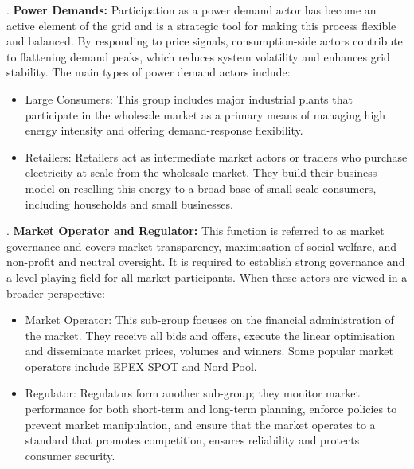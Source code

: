 . \textbf{Power Demands:} Participation as a power demand actor has become an active element of the grid and is a strategic tool for making this process flexible and balanced. By responding to price signals, consumption-side actors contribute to flattening demand peaks, which reduces system volatility and enhances grid stability. The main types of power demand actors include:
\begin{itemize}
    \item Large Consumers: This group includes major industrial plants that participate in the wholesale market as a primary means of managing high energy intensity and offering demand-response flexibility.
    \item Retailers: Retailers act as intermediate market actors or traders who purchase electricity at scale from the wholesale market. They build their business model on reselling this energy to a broad base of small-scale consumers, including households and small businesses.
\end{itemize}

. \textbf{Market Operator and Regulator:} This function is referred to as market governance and covers market transparency, maximisation of social welfare, and non-profit and neutral oversight. It is required to establish strong governance and a level playing field for all market participants. When these actors are viewed in a broader perspective:
\begin{itemize}
    \item Market Operator: This sub-group focuses on the financial administration of the market. They receive all bids and offers, execute the linear optimisation and disseminate market prices, volumes and winners. Some popular market operators include EPEX SPOT and Nord Pool.
    \item Regulator: Regulators form another sub-group; they monitor market performance for both short-term and long-term planning, enforce policies to prevent market manipulation, and ensure that the market operates to a standard that promotes competition, ensures reliability and protects consumer security.
\end{itemize}

